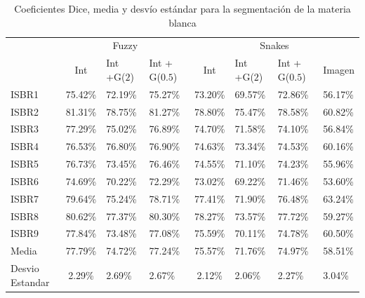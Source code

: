 \begin{table}[h]
	\centering
	\begin{tabular}{l|cll|clll}
		& \multicolumn{3}{c|}{Fuzzy} & \multicolumn{4}{c}{Snakes} \\ \cline{2-8} 
		& Int & Int +G($2$) & Int + G($0.5$) & Int & Int +G($2$) & Int + G($0.5$) & Imagen \\ \hline
		ISBR1 & 75.42\% & 72.19\% & 75.27\% & 73.20\% & 69.57\% & 72.86\% & 56.17\% \\
		ISBR2 & 81.31\% & 78.75\% & 81.27\% & 78.80\% & 75.47\% & 78.58\% & 60.82\% \\
		ISBR3 & 77.29\% & 75.02\% & 76.89\% & 74.70\% & 71.58\% & 74.10\% & 56.84\% \\
		ISBR4 & 76.53\% & 76.80\% & 76.90\% & 74.63\% & 73.34\% & 74.53\% & 60.16\% \\
		ISBR5 & 76.73\% & 73.45\% & 76.46\% & 74.55\% & 71.10\% & 74.23\% & 55.96\% \\
		ISBR6 & 74.69\% & 70.22\% & 72.29\% & 73.02\% & 69.22\% & 71.46\% & 53.60\% \\
		ISBR7 & 79.64\% & 75.24\% & 78.71\% & 77.41\% & 71.90\% & 76.48\% & 63.24\% \\
		ISBR8 & 80.62\% & 77.37\% & 80.30\% & 78.27\% & 73.57\% & 77.72\% & 59.27\% \\
		ISBR9 & 77.84\% & 73.48\% & 77.08\% & 75.59\% & 70.11\% & 74.78\% & 60.50\% \\ \hline
		Media & 77.79\% & 74.72\% & 77.24\% & 75.57\% & 71.76\% & 74.97\% & 58.51\% \\ \hline
		Desvio Estandar & 2.29\% & 2.69\% & 2.67\% & 2.12\% & 2.06\% & 2.27\% & 3.04\%
	\end{tabular}
	\caption{Coeficientes Dice, media y desvío estándar para la segmentación de la materia blanca}
	\label{table:resultados_blanca}
\end{table}

